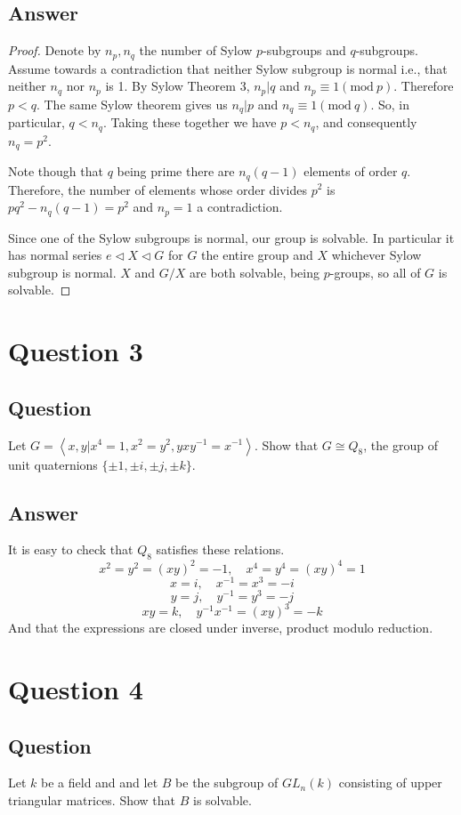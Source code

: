 \documentclass[11pt]{article}
\begin{document}
\subsection{Answer}
\begin{proof}
Denote by $n_p, n_q$ the number of Sylow $p$-subgroups and $q$-subgroups. Assume towards a contradiction that neither Sylow subgroup is normal i.e., that neither $n_q$ nor $n_p$ is 1. By Sylow Theorem 3, $n_p | q$ and $n_p \equiv 1 (\mathrm{mod\ } p)$. Therefore $p<q$. The same Sylow theorem gives us $n_q | p$ and $n_q \equiv 1 (\mathrm{mod\ } q)$. So, in particular, $q<n_q$. Taking these together we have $p<n_q$, and consequently $n_q=p^2$.

Note though that $q$ being prime there are $n_q (q-1)$ elements of order $q$. Therefore, the number of elements whose order divides $p^2$ is $pq^2-n_q(q-1)=p^2$ and $n_p=1$ a contradiction.

Since one of the Sylow subgroups is normal, our group is solvable. In particular it has normal series $e \lhd X \lhd G $ for $G$ the entire group and $X$ whichever Sylow subgroup is normal. $X$ and $ G/ X $ are both solvable, being $p$-groups, so all of $G$ is solvable.
\end{proof}

\section{Question 3}
\subsection{Question}
Let $G=\left< x,y | x^4=1, x^2=y^2, yxy^{-1}=x^{-1}\right>$. Show that $G\cong Q_8$, the group of unit quaternions $\{\pm1, \pm i, \pm j, \pm k\}$.
\subsection{Answer}
It is easy to check that $Q_8$ satisfies these relations. 
\[  x^2=y^2=(xy)^2=-1 ,\quad x^4=y^4=(xy)^4=1\]
\[x = i , \quad   x^{-1}=x^3=-i \]
\[y = j, \quad y^{-1}=y^3=-j\]
\[xy = k, \quad y^{-1}x^{-1}=(xy)^3=-k\]
And that the expressions are closed under inverse, product modulo reduction.




\section{Question 4}
\subsection{Question}
Let $k$ be a field and and let $B$ be the subgroup of $GL_n(k)$ consisting of upper triangular matrices. Show that $B$ is solvable.
\end{document}
